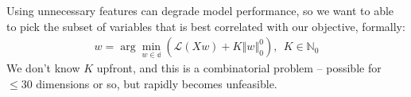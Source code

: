 Using unnecessary features can degrade model performance, so we want to able to pick the subset of variables that is best correlated with our objective, formally:
\begin{align*}
w=\arg\min_{w\in \mathbb{d}}\left(\mathcal{L}\left( Xw \right) + K\left\Vert w \right\Vert^{0}_{0} \right),\: \: K\in\mathbb{N}_{0}
\end{align*}
\pause{}
We don't know $K$ upfront, and  this is a combinatorial problem -- possible for $\leq 30$ dimensions or so, but rapidly becomes unfeasible.